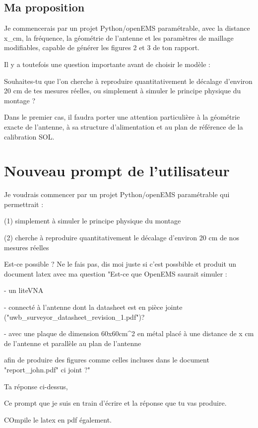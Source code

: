 \documentclass[11pt,a4paper]{article}
\begin{document}
\subsection*{Ma proposition}
\par\medskip
Je commencerais par un projet Python/openEMS paramétrable, avec la distance x\_cm, la fréquence, la géométrie de l'antenne et les paramètres de maillage modifiables, capable de générer les figures 2 et 3 de ton rapport.\par
\par\medskip
Il y a toutefois une question importante avant de choisir le modèle :\par
\par\medskip
Souhaites-tu que l'on cherche à reproduire quantitativement le décalage d'environ 20 cm de tes mesures réelles, ou simplement à simuler le principe physique du montage ?\par
\par\medskip
Dans le premier cas, il faudra porter une attention particulière à la géométrie exacte de l'antenne, à sa structure d'alimentation et au plan de référence de la calibration SOL.\par
\newpage
\section{Nouveau prompt de l’utilisateur}
Je voudrais commencer par un projet Python/openEMS paramétrable qui permettrait :\par
\par\medskip
(1) simplement à simuler le principe physique du montage\par
\par\medskip
(2) cherche à reproduire quantitativement le décalage d'environ 20 cm de nos mesures réelles\par
\par\medskip
Est-ce possible ? Ne le fais pas, dis moi juste si c'est possbible et produit un document latex avec ma question "Est-ce que OpenEMS saurait simuler :\par
\par\medskip
- un liteVNA \par
- connecté à l'antenne dont la datasheet est en pièce jointe ("uwb\_surveyor\_datasheet\_revision\_1.pdf")?\par
- avec une plaque de dimension 60x60cm\textasciicircum{}2 en métal placé à une distance de x cm de l'antenne et parallèle au plan de l'antenne \par
\par\medskip
afin de produire des figures comme celles incluses dans le document "report\_john.pdf" ci joint ?"\par
\par\medskip
Ta réponse ci-dessus,\par
\par\medskip
Ce prompt que je suis en train d'écrire et la réponse que tu vas produire.\par
\par\medskip
COmpile le latex en pdf également.\par
\newpage
\end{document}

